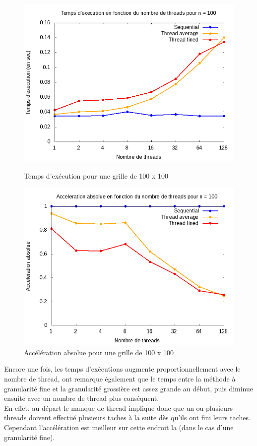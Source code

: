 \documentclass[10pt,a4paper]{article}
\begin{document}
\begin{figure}[h]
  \centering
  \begin{minipage}[b]{0.49\textwidth}
	\includegraphics[width=\textwidth]{./Time/size_100_time.png}
    \caption{Temps d'exécution pour une grille de 100 x 100}
  \end{minipage}
  \hfill
  \begin{minipage}[b]{0.49\textwidth}
    \includegraphics[width=\textwidth]{./Time/size_100_acceleration.png}
    \caption{Accélération absolue pour une grille de 100 x 100}
  \end{minipage}
\end{figure}

Encore une fois, les temps d'exécutions augmente proportionnellement avec le nombre de thread, ont remarque également que le temps entre la méthode à granularité fine et la granularité grossière est assez grande au début, puis diminue ensuite avec un nombre de thread plus conséquent.\\
En effet, au départ le manque de thread implique donc que un ou plusieurs threads doivent effectué plusieurs taches à la suite dès qu'ils ont fini leurs taches. \\
Cependant l'accélération est meilleur sur cette endroit la (dans le cas d'une granularité fine). \\
\end{document}

